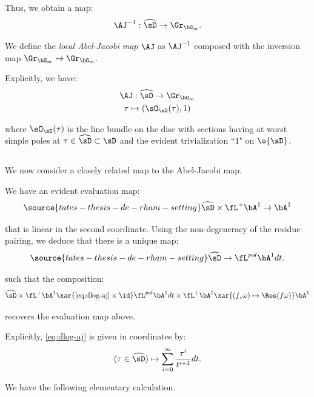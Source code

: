 Thus, we obtain a map:
%
\[
\AJ^{-1}:\widehat{\sD} \to \Gr_{\bG_m}.
\]

 We
define the \emph{local Abel-Jacobi map}
$\AJ$ as $\AJ^{-1}$ composed
with the inversion map $\Gr_{\bG_m} \to \Gr_{\bG_m}$.

Explicitly, we have:
%
\[
\begin{gathered}
\AJ: \widehat{\sD} \to \Gr_{\bG_m} \\
\tau \mapsto (\sO_{\sD}(\tau),1)
\end{gathered}
\]

 where $\sO_{\sD}(\tau)$ is the line bundle on
the disc with sections having at worst simple
poles at $\tau \in \widehat{\sD} \subset \sD$
and the evident trivialization ``$1$" on $\o{\sD}$.

\subsection{}\label{ss:dlog-aj}

We now consider a closely related map to the Abel-Jacobi map.

We have an evident evaluation map:
%
\begin{equation}\label{eq:ev-a1}
\source{tates-thesis-de-rham-setting}
\widehat{\sD} \times \fL^+ \bA^1 \to \bA^1
\end{equation}

 that is linear in the second coordinate.
Using the non-degeneracy of the residue pairing,
we deduce that there is a unique map:
%
\begin{equation}\label{eq:dlog-aj}
\source{tates-thesis-de-rham-setting}
\widehat{\sD} \to
\fL^{pol} \bA^1 dt.
\end{equation}

 such that the composition:
%
\[
\widehat{\sD} \times \fL^+ \bA^1
\xar{\eqref{eq:dlog-aj} \times \id}
\fL^{pol} \bA^1 dt \times
\fL^+ \bA^1 \xar{(f,\omega) \mapsto \Res(f\omega)}
\bA^1
\]

 recovers the evaluation map above.

\begin{rem}
\notready\label{r:dlog-aj-fmla}

Explicitly, \eqref{eq:dlog-aj} is given in coordinates
by:
%
\[
(\tau \in \widehat{\sD}) \mapsto \sum_{i = 0}^{\infty}
\frac{\tau^i}{t^{i+1}} dt.
\]

\end{rem}

We have the following elementary calculation.

